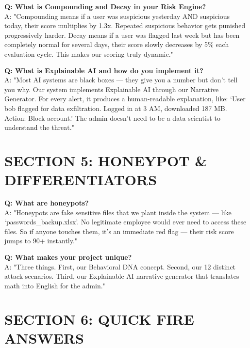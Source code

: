 \documentclass[12pt,a4paper]{article}
\begin{document}
\textbf{Q: What is Compounding and Decay in your Risk Engine?} \\
A: "Compounding means if a user was suspicious yesterday AND suspicious today, their score multiplies by 1.3x. Repeated suspicious behavior gets punished progressively harder. Decay means if a user was flagged last week but has been completely normal for several days, their score slowly decreases by 5\% each evaluation cycle. This makes our scoring truly dynamic."
\vspace{10pt}

\textbf{Q: What is Explainable AI and how do you implement it?} \\
A: "Most AI systems are black boxes — they give you a number but don't tell you why. Our system implements Explainable AI through our Narrative Generator. For every alert, it produces a human-readable explanation, like: `User bob flagged for data exfiltration. Logged in at 3 AM, downloaded 187 MB. Action: Block account.' The admin doesn't need to be a data scientist to understand the threat."
\vspace{10pt}


\section*{SECTION 5: HONEYPOT \& DIFFERENTIATORS}

\textbf{Q: What are honeypots?} \\
A: "Honeypots are fake sensitive files that we plant inside the system — like `passwords\_backup.xlsx'. No legitimate employee would ever need to access these files. So if anyone touches them, it's an immediate red flag — their risk score jumps to 90+ instantly."
\vspace{10pt}

\textbf{Q: What makes your project unique?} \\
A: "Three things. First, our Behavioral DNA concept. Second, our 12 distinct attack scenarios. Third, our Explainable AI narrative generator that translates math into English for the admin."
\vspace{10pt}


\section*{SECTION 6: QUICK FIRE ANSWERS}
\end{document}
